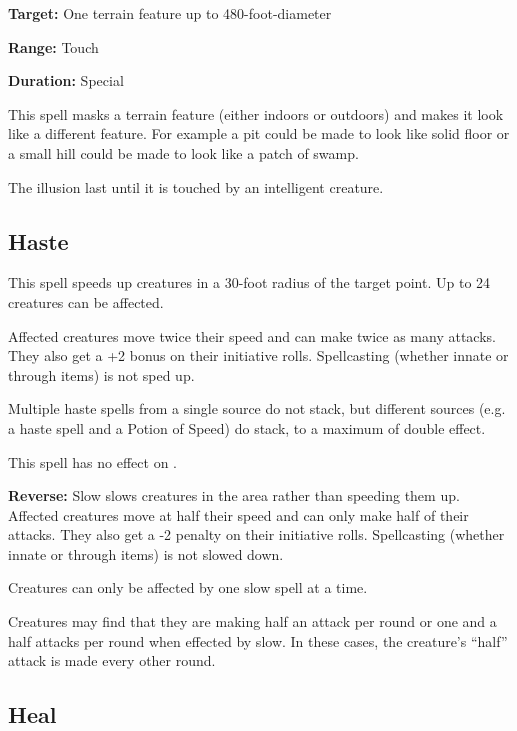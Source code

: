 \begin{multicols*}{2}
{\textbf{Target:} One terrain feature up to 480-foot-diameter

\textbf{Range:} Touch

\textbf{Duration:} Special}

This spell masks a terrain feature (either indoors or outdoors) and makes it look like a different feature. For example a pit could be made to look like solid floor or a small hill could be made to look like a patch of swamp.

The illusion last until it is touched by an intelligent creature.

\subsection{Haste}\label{spell:Haste}

This spell speeds up creatures in a 30-foot radius of the target point. Up to 24 creatures can be affected.

Affected creatures move twice their speed and can make twice as many attacks. They also get a +2 bonus on their initiative rolls. Spellcasting (whether innate or through items) is not sped up.

Multiple haste spells from a single source do not stack, but different sources (e.g. a haste spell and a Potion of Speed) do stack, to a maximum of double effect.

This spell has no effect on .

\textbf{Reverse:} \hypertarget{spell:Slow}{Slow} slows creatures in the area rather than speeding them up. Affected creatures move at half their speed and can only make half of their attacks. They also get a -2 penalty on their initiative rolls. Spellcasting (whether innate or through items) is not slowed down.

Creatures can only be affected by one slow spell at a time.

Creatures may find that they are making half an attack per round or one and a half attacks per round when effected by slow. In these cases, the creature’s “half” attack is made every other round.

\subsection{Heal}\label{spell:Heal}
\end{multicols*}
